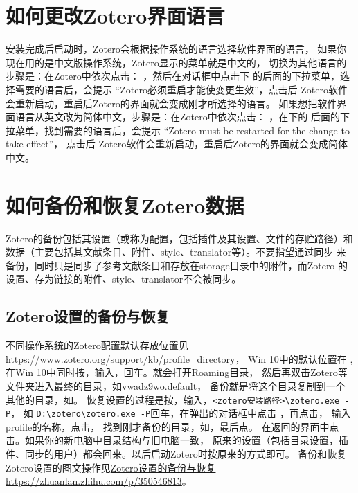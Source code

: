 \documentclass[cn,11pt,chinese]{elegantbook}
\begin{document}
	\section{如何更改Zotero界面语言} \label{sec:chang_gui_lan}
			安装完成后启动时，Zotero会根据操作系统的语言选择软件界面的语言，
			如果你现在用的是中文版操作系统，Zotero显示的菜单就是中文的，
			切换为其他语言的步骤是：在Zotero中依次点击：
			，然后在对话框中点击下
			的后面的下拉菜单，选择需要的语言后，会提示
			“Zotero必须重启才能使变更生效”，点击后
			Zotero软件会重新启动，重启后Zotero的界面就会变成刚才所选择的语言。
			如果想把软件界面语言从英文改为简体中文，步骤是：在Zotero中依次点击：
			，在下的
			后面的下拉菜单，找到需要的语言后，会提示
			“Zotero must be restarted for the change to take effect”，
			点击后
			Zotero软件会重新启动，重启后Zotero的界面就会变成简体中文。

	\section{如何备份和恢复Zotero数据} \label{sec:back}
 		Zotero的备份包括其设置（或称为配置，包括插件及其设置、文件的存贮路径）和
		数据（主要包括其文献条目、附件、style、translator等）。不要指望通过同步
		来备份，同时只是同步了参考文献条目和存放在storage目录中的附件，而Zotero
		的设置、存为链接的附件、style、translator不会被同步。

		\subsection{Zotero设置的备份与恢复}
					不同操作系统的Zotero配置默认存放位置见\url{https://www.zotero.org/support/kb/profile_directory}，
					Win 10中的默认位置在
					,
					在Win 10中同时按，输入，回车。就会打开Roaming目录，
					然后再双击Zotero等文件夹进入最终的目录，如vwadz9wo.default，
					备份就是将这个目录复制到一个其他的目录，如。
					恢复设置的过程是按，输入，\verb|<zotero安装路径>\zotero.exe -P|，
					如 \verb|D:\zotero\zotero.exe -P|回车，在弹出的对话框中点击
					，再点击，
					输入profile的名称，点击，
					找到刚才备份的目录，如，最后点。
					在返回的界面中点击。如果你的新电脑中目录结构与旧电脑一致，
					原来的设置（包括目录设置，插件、同步的用户）都会回来。以后启动Zotero时按原来的方式即可。
					备份和恢复Zotero设置的图文操作见\href{https://zhuanlan.zhihu.com/p/350546813}
					{Zotero设置的备份与恢复https://zhuanlan.zhihu.com/p/350546813}。
\end{document}
